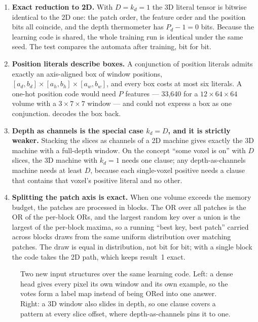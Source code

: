\begin{enumerate}[leftmargin=1.4em, itemsep=0.3em, topsep=0.35em]
  \item \textbf{Exact reduction to 2D.} With $D = k_d = 1$ the 3D literal tensor is bitwise
    identical to the 2D one: the patch order, the feature order and the position bits all
    coincide, and the depth thermometer has $P_d - 1 = 0$ bits. Because the learning code is
    shared, the whole training run is identical under the same seed. The test compares the
    automata after training, bit for bit.
  \item \textbf{Position literals describe boxes.} A conjunction of position literals admits
    exactly an axis-aligned box of window positions, $[a_d,b_d]\times[a_h,b_h]\times[a_w,b_w]$,
    and every box costs at most six literals. A one-hot position code would need $P$ features
    --- 33{,}640 for a $12\times64\times64$ volume with a $3\times7\times7$ window --- and
    could not express a box as one conjunction.  decodes the box back.
  \item \textbf{Depth as channels is the special case $k_d = D$, and it is strictly weaker.}
    Stacking the slices as channels of a 2D machine gives exactly the 3D machine with a
    full-depth window. On the concept ``some voxel is on'' with $D$ slices, the 3D machine
    with $k_d = 1$ needs one clause; any depth-as-channels machine needs at least $D$, because
    each single-voxel positive needs a clause that contains that voxel's positive literal and
    no other.
  \item \textbf{Splitting the patch axis is exact.} When one volume exceeds the memory budget,
    the patches are processed in blocks. The OR over all patches is the OR of the per-block
    ORs, and the largest random key over a union is the largest of the per-block maxima, so a
    running ``best key, best patch'' carried across blocks draws from the same uniform
    distribution over matching patches. The draw is equal in distribution, not bit for bit;
    with a single block the code takes the 2D path, which keeps result~1 exact.
\end{enumerate}

\begin{figure}[htbp]
\centering
\resizebox{\linewidth}{!}{}
\caption{Two new input structures over the same learning code. Left: a dense head gives every
  pixel its own window and its own example, so the votes form a label map instead of being
  ORed into one answer. Right: a 3D window also slides in depth, so one clause covers a
  pattern at every slice offset, where depth-as-channels pins it to one.}
\label{fig:structures}
\end{figure}

